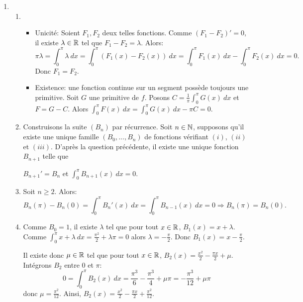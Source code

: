 
\begin{enumerate}
 \item \begin{enumerate}
            \item \begin{itemize}
                   \item[\textbullet] Unicité: Soient $F_{1}, F_{2}$ deux telles fonctions. Comme $(F_{1}-F_{2})' = 0$, il existe $\lambda \in \mathbb{R}$ tel que $F_{1}-F_{2} = \lambda$. Alors:
                   \[ \pi \lambda = \int_{0}^{\pi}\lambda \ dx = \int_{0}^{\pi}(F_{1}(x) - F_{2}(x))\ dx = \int_{0}^{\pi}F_{1}(x)\ dx - \int_{0}^{\pi}F_{2}(x)\ dx = 0.\]
                   Donc $F_{1} = F_{2}$.
                   \item[\textbullet] Existence: une fonction continue sur un segment possède toujours une primitive. Soit $G$ une primitive de $f$. Posons $C = \displaystyle{\frac{1}{\pi}\int_{0}^{\pi}G(x)\ dx}$ et $F = G-C$. Alors
            $\displaystyle{\int_{0}^{\pi}F(x)\ dx = \int_{0}^{\pi}G(x)\ dx - \pi C = 0}$.
                  \end{itemize}
          
            \item Construisons la suite $(B_{n})$ par récurrence. Soit $n\in \mathbb{N}$, supposons qu'il existe une unique famille $(B_{0}, ..., B_{n})$ de fonctions vérifiant $(i)$, $(ii)$ et $(iii)$. 
            D'après la question précédente, il existe une unique fonction $B_{n+1}$ telle que 
            
            $B_{n+1}' = B_{n}$ et $\displaystyle{\int_{0}^{\pi}B_{n+1}(x)\ dx = 0}$. 
            
            \item Soit $n\geq 2$. Alors:
            \[ B_{n}(\pi) - B_{n}(0) = \int_{0}^{\pi}B_{n}'(x)\ dx = \int_{0}^{\pi}B_{n-1}(x)\ dx = 0
            \Rightarrow B_{n}(\pi) = B_{n}(0).
            \]
            
            \item Comme $B_{0} = 1$, il existe $\lambda$ tel que pour tout $x\in \mathbb{R}$, $B_{1}(x) = x + \lambda$. Comme $\displaystyle{\int_{0}^{\pi}x + \lambda \ dx = \frac{\pi^{2}}{2} + \lambda \pi = 0}$
            alors $\lambda = \displaystyle{-\frac{\pi}{2}}$. Donc $B_{1}(x) = \displaystyle{x - \frac{\pi}{2}}$. 
            
            Il existe donc $\mu \in \mathbb{R}$ tel que pour tout $x\in \mathbb{R}$, $B_{2}(x) = \displaystyle{\frac{x^{2}}{2}-\frac{\pi x}{2} + \mu}$. Intégrons $B_{2}$ entre $0$ et $\pi$:
            \[ 0 = \int_{0}^{\pi}B_{2}(x)\ dx = \frac{\pi^{3}}{6} - \frac{\pi^{3}}{4} + \mu \pi  = -\frac{\pi^{3}}{12} + \mu \pi\]
            donc $\mu = \displaystyle{\frac{\pi^{2}}{12}}$. Ainsi, $\displaystyle{B_{2}(x) = \frac{x^{2}}{2} - \frac{\pi x}{2} + \frac{\pi^{2}}{12}}$.
           \end{enumerate}
           


\end{enumerate}
